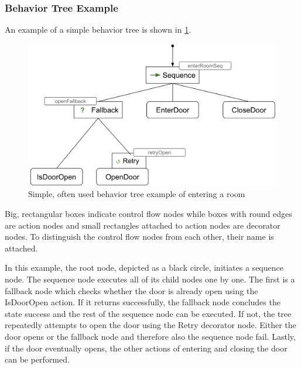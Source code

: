 \subsubsection{Behavior Tree Example}\label{subsubsec:BT_exp}

An example of a simple behavior tree is shown in \cref{fig:BT_exp}.

\begin{figure}[h]
\centering
\includegraphics[scale=0.2]{images/system_overview/BT_example.png}
\caption{Simple, often used behavior tree example of entering a room}
\label{fig:BT_exp}
\end{figure}

Big, rectangular boxes indicate control flow nodes while boxes with round edges are action nodes and small rectangles attached to action nodes are decorator nodes. To distinguish the control flow nodes from each other, their name is attached.

In this example, the root node, depicted as a black circle, initiates a sequence node. The sequence node executes all of its child nodes one by one. The first is a fallback node which checks whether the door is already open using the IsDoorOpen action. If it returns successfully, the fallback node concludes the state success and the rest of the sequence node can be executed. If not, the tree repeatedly attempts to open the door using the Retry decorator node. Either the door opens or the fallback node and therefore also the sequence node fail. Lastly, if the door eventually opens, the other actions of entering and closing the door can be performed.






